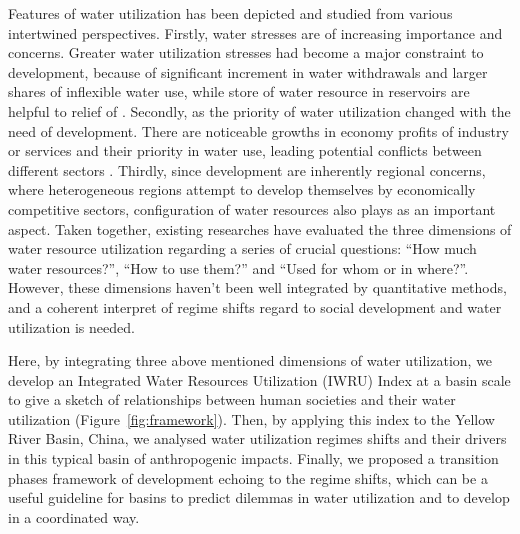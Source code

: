 \documentclass[9pt, twocolumn, twoside, lineno]{pnas-new}
\begin{document}
Features of water utilization has been depicted and studied from various intertwined perspectives.
Firstly, water stresses are of increasing importance and concerns.
Greater water utilization stresses had become a major constraint to development, because of significant increment in water withdrawals and larger shares of inflexible water use, while store of water resource in reservoirs are helpful to relief of
\cite{postelHumanAppropriationRenewable1996, greveGlobalAssessmentWater2018, qinFlexibilityIntensityGlobal2019}.
Secondly, as the priority of water utilization changed with the need of development. 
There are noticeable growths in economy profits of industry or services and their priority in water use, leading potential conflicts between different sectors
\cite{liuWaterScarcityAssessments2017, florkeWaterCompetitionCities2018}.
Thirdly, since development are inherently regional concerns, where heterogeneous regions attempt to develop themselves by economically competitive sectors, configuration of water resources also plays as an important aspect.
Taken together, existing researches have evaluated the three dimensions of water resource utilization regarding a series of crucial questions: ``How much water resources?'', ``How to use them?'' and ``Used for whom or in where?''.
However, these dimensions haven't been well integrated by quantitative methods, and a coherent interpret of regime shifts regard to social development and water utilization is needed.


Here, by integrating three above mentioned dimensions of water utilization, we develop an Integrated Water Resources Utilization (IWRU) Index at a basin scale to give a sketch of relationships between human societies and their water utilization (Figure~\ref{fig:framework}).
Then, by applying this index to the Yellow River Basin, China, we analysed water utilization regimes shifts and their drivers in this typical basin of anthropogenic impacts.
Finally, we proposed a transition phases framework of development echoing to the regime shifts, which can be a useful guideline for basins to predict dilemmas in water utilization and to develop in a coordinated way.
\end{document}
